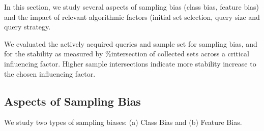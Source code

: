 \documentclass[11pt,a4paper]{article}
\begin{document}
\begin{table}[t]
\small\addtolength{\tabcolsep}{-4.5pt}
\centering
{}
\caption{Label entropy with a large query size ( queries).   denotes averaging across queries of a single run,  denotes the label entropy of the final collected samples, averaged across seeds. Naive Bayes () has biased (inefficient) queries  while FastText () shows stable, high label entropy showing a rich diversity in classes despite the large query size. Overall, the resultant sample  () becomes balanced in both cases.}
\label{tab:label_entropy}
\end{table}



In this section, we study several aspects of sampling bias (class bias, feature bias) and the impact of relevant algorithmic factors (initial set selection, query size and query strategy. 

We evaluated the actively acquired queries and sample set for sampling bias, and for the stability as measured by \%intersection of collected sets across a critical influencing factor. Higher sample intersections indicate more stability increase to the chosen influencing factor. 

\subsection{Aspects of Sampling Bias}\label{sec:biases}

We study two types of sampling biases: (a) Class Bias and (b) Feature Bias.
\end{document}

